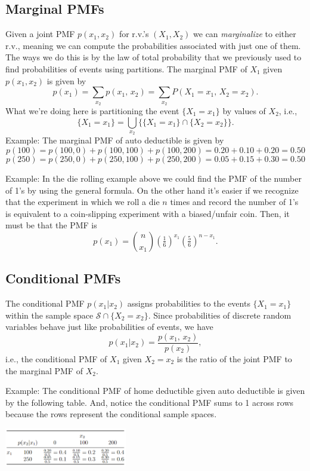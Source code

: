 \documentclass[
]{book}
\begin{document}
\hypertarget{marginal-pmfs}{%
\subsection{Marginal PMFs}\label{marginal-pmfs}}

Given a joint PMF \(p(x_1, x_2)\) for r.v.'s \((X_1, X_2)\) we can \emph{marginalize} to either r.v., meaning we can compute the probabilities associated with just one of them. The ways we do this is by the law of total probability that we previously used to find probabilities of events using partitions. The marginal PMF of \(X_1\) given \(p(x_1, x_2)\) is given by
\[p(x_1) = \sum_{x_2} p(x_1, \, x_2) = \sum_{x_2} P(X_1 = x_1, \, X_2 = x_2).\]
What we're doing here is partitioning the event \(\{X_1 = x_1\}\) by values of \(X_2\), i.e.,
\[\{X_1 = x_1\} = \bigcup_{x_2}\{\{X_1 = x_1\}\cap\{X_2 = x_2\}\}.\]
Example: The marginal PMF of auto deductible is given by
\[p(100) = p(100,0)+p(100,100)+p(100,200) = 0.20+0.10+0.20=0.50\]
\[p(250) = p(250,0)+p(250,100)+p(250,200) = 0.05+0.15+0.30=0.50\]

Example: In the die rolling example above we could find the PMF of the number of 1's by using the general formula. On the other hand it's easier if we recognize that the experiment in which we roll a die \(n\) times and record the number of 1's is equivalent to a coin-slipping experiment with a biased/unfair coin. Then, it must be that the PMF is
\[p(x_1) = {n \choose x_1}(\tfrac16)^{x_1}(\tfrac56)^{n-x_1}.\]

\hypertarget{conditional-pmfs}{%
\subsection{Conditional PMFs}\label{conditional-pmfs}}

The conditional PMF \(p(x_1|x_2)\) assigns probabilities to the events \(\{X_1 = x_1\}\) within the sample space \(\mathcal{S}\cap \{X_2 = x_2\}\). Since probabilities of discrete random variables behave just like probabilities of events, we have
\[p(x_1|x_2) = \frac{p(x_1, \, x_2)}{p(x_2)},\]
i.e., the conditional PMF of \(X_1\) given \(X_2 = x_2\) is the ratio of the joint PMF to the marginal PMF of \(X_2\).

Example: The conditional PMF of home deductible given auto deductible is given by the following table. And, notice the conditional PMF sums to 1 across rows because the rows represent the conditional sample spaces.

\includegraphics[width=0.4\textwidth,height=\textheight]{cond_pmf.PNG}
\end{document}
